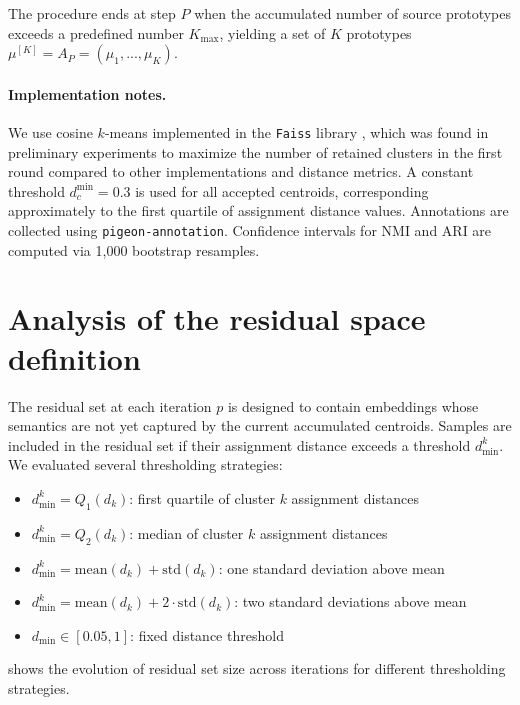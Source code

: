 \documentclass[runningheads]{llncs}
\begin{document}
The procedure ends at step $P$ when the accumulated number of source prototypes exceeds a predefined number $K_{\text{max}}$, yielding a set of $K$ prototypes $\mu^{[K]} = A_P = (\mu_1, ..., \mu_K)$.

\paragraph{Implementation notes.}
We use cosine $k$-means implemented in the \texttt{Faiss} library \cite{douze2024faiss}, which was found in preliminary experiments to maximize the number of retained clusters in the first round compared to other implementations and distance metrics. A constant threshold $d_c^{\text{min}}=0.3$ is used for all accepted centroids, corresponding approximately to the first quartile of assignment distance values. Annotations are collected using \texttt{pigeon-annotation}. Confidence intervals for NMI and ARI are computed via 1,000 bootstrap resamples.

\section{Analysis of the residual space definition}
\label{sec:supp_residual_thresholding}

The residual set at each iteration $p$ is designed to contain embeddings whose semantics are not yet captured by the current accumulated centroids. Samples are included in the residual set if their assignment distance exceeds a threshold $d_{\min}^k$. We evaluated several thresholding strategies:

\begin{itemize}
    \item $d_{\min}^k = Q_1(d_k)$: first quartile of cluster $k$ assignment distances
    \item $d_{\min}^k = Q_2(d_k)$: median of cluster $k$ assignment distances
    \item $d_{\min}^k = \text{mean}(d_k) + \text{std}(d_k)$: one standard deviation above mean
    \item $d_{\min}^k = \text{mean}(d_k) + 2\cdot\text{std}(d_k)$: two standard deviations above mean
    \item $d_{\min} \in [0.05, 1]$: fixed distance threshold
\end{itemize}

 shows the evolution of residual set size across iterations for different thresholding strategies.
\end{document}
